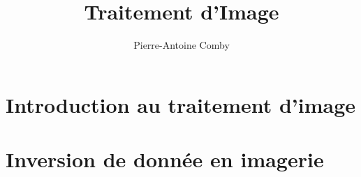 \documentclass[openany]{../../cours}
\author{Pierre-Antoine Comby}
\title{Traitement d'Image}
\begin{document}
\maketitle
\tableofcontents
\chapter{Introduction au traitement d'image}

\chapter{Inversion de donnée en imagerie}

\end{document}
